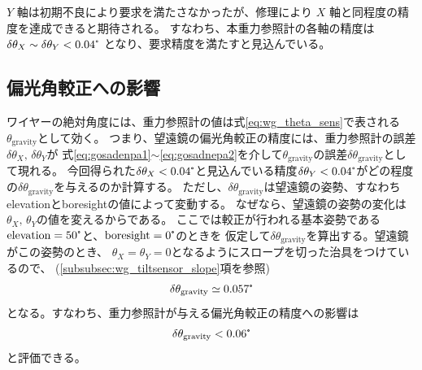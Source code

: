 \documentclass[../../main.tex]{subfiles}
\begin{document}
$Y$ 軸は初期不良により要求を満たさなかったが、修理により $X$ 軸と同程度の精度を達成できると期待される。
すなわち、本重力参照計の各軸の精度は $\delta\theta_X\sim\delta\theta_Y<0.04\tcdegree$ となり、要求精度を満たすと見込んでいる。

\subsection{偏光角較正への影響}
ワイヤーの絶対角度には、重力参照計の値は式\eqref{eq:wg_theta_sens}で表される$\theta_{\mathrm{gravity}}$として効く。
つまり、望遠鏡の偏光角較正の精度には、重力参照計の誤差$\delta\theta_{X},\,\delta\theta_{Y}$が
式\eqref{eq:gosadenpa1}$\sim$\eqref{eq:gosadnepa2}を介して$\theta_{\mathrm{gravity}}$の誤差$\delta\theta_{\mathrm{gravity}}$として現れる。
今回得られた$\delta\theta_{X}<0.04\tcdegree$と見込んでいる精度$\delta\theta_{Y}<0.04\tcdegree$がどの程度の$\delta\theta_{\mathrm{gravity}}$を与えるのか計算する。
ただし、$\delta\theta_{\mathrm{gravity}}$は望遠鏡の姿勢、すなわちelevationとboresightの値によって変動する。
なぜなら、望遠鏡の姿勢の変化は$\theta_{X},\,\theta_{Y}$の値を変えるからである。
ここでは較正が行われる基本姿勢である$\mathrm{elevation}=50\tcdegree$と、$\mathrm{boresight}=0\tcdegree$のときを
仮定して$\delta\theta_{\mathrm{gravity}}$を算出する。望遠鏡がこの姿勢のとき、
$\theta_{X}=\theta_{Y}=0$となるようにスロープを切った治具をつけているので、
(\ref{subsubsec:wg_tiltsensor_slope}項を参照)
\begin{equation}
    \delta\theta_{\mathrm{gravity}} \simeq 0.057\tcdegree
\end{equation}
となる。すなわち、重力参照計が与える偏光角較正の精度への影響は
\begin{equation}
    \delta\theta_{\mathrm{gravity}} < 0.06\tcdegree
\end{equation}
と評価できる。
\end{document}
